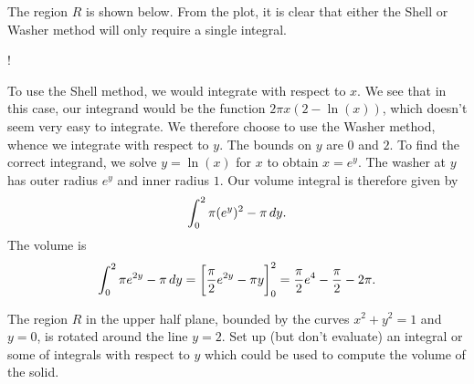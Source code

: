 \documentclass[]{ximera}
\begin{document}
\begin{freeResponse}
The region $R$ is shown below. From the plot, it is clear that either the Shell or Washer method will only require a single integral.

\begin{center}
\resizebox {6cm} {!} {
}
	\end{center}
	
To use the Shell method, we would integrate with respect to $x$. We see that in this case, our integrand would be the function $2 \pi x (2-\ln (x))$, which doesn't seem very easy to integrate. We therefore choose to use the Washer method, whence we integrate with respect to $y$. The bounds on $y$ are $0$ and $2$. To find the correct integrand, we solve $y = \ln (x)$ for $x$ to obtain $x = e^y$. The washer at $y$ has outer radius $e^y$ and inner radius $1$. Our volume integral is therefore given by
$$
\int_0^2 \pi (e^y)^2 - \pi \mathop{}\!d y.
$$
The volume is
$$
\int_0^2 \pi e^{2y} - \pi \mathop{}\!d y = \bigg[ \frac{\pi}{2} e^{2y} - \pi y \bigg]_0^2 = \frac{\pi}{2} e^4 - \frac{\pi}{2} -2\pi.
$$


\end{freeResponse}

\begin{problem}
The region $R$ in the upper half plane, bounded by the curves $x^2+y^2 = 1$ and $y=0$, is rotated around the line $y=2$. Set up (but don't evaluate) an integral or some of integrals with respect to $y$ which could be used to compute the volume of the solid.
\end{problem}
\end{document}
